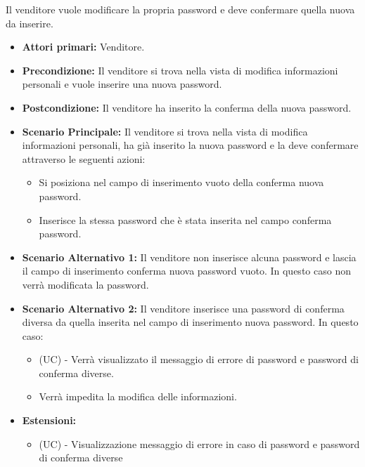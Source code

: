 Il venditore vuole modificare la propria password e deve confermare quella nuova da inserire.
\begin{itemize}
    \item \textbf{Attori primari:} Venditore.
    \item \textbf{Precondizione:} Il venditore si trova nella vista di modifica informazioni personali e vuole inserire una nuova password.
    \item \textbf{Postcondizione:} Il venditore ha inserito la conferma della nuova password.
    \item \textbf{Scenario Principale:} Il venditore si trova nella vista di modifica informazioni personali, ha già inserito la nuova password e la deve confermare attraverso le seguenti azioni:
        \begin{itemize}
            \item Si posiziona nel campo di inserimento vuoto della conferma nuova password.
            \item Inserisce la stessa password che è stata inserita nel campo conferma password.
        \end{itemize}
    \item \textbf{Scenario Alternativo 1:} Il venditore non inserisce alcuna password e lascia il campo di inserimento conferma nuova password vuoto. In questo caso non verrà modificata la password.
    \item \textbf{Scenario Alternativo 2:} Il venditore inserisce una password di conferma diversa da quella inserita nel campo di inserimento nuova password. In questo caso:
    \begin{itemize}
        \item (UC) - Verrà visualizzato il messaggio di errore di password e password di conferma diverse.
        \item Verrà impedita la modifica delle informazioni.
    \end{itemize}
    \item \textbf{Estensioni:}
    \begin{itemize}
        \item (UC) - Visualizzazione messaggio di errore in caso di password e password di conferma diverse
    \end{itemize}
\end{itemize}

